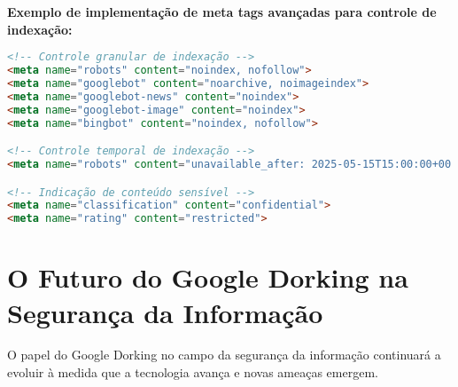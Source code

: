 \documentclass[12pt,a4paper]{book}
\begin{document}
\begin{examplebox}
\textbf{Exemplo de implementação de meta tags avançadas para controle de indexação:}

\begin{lstlisting}[language=html]
<!-- Controle granular de indexação -->
<meta name="robots" content="noindex, nofollow">
<meta name="googlebot" content="noarchive, noimageindex">
<meta name="googlebot-news" content="noindex">
<meta name="googlebot-image" content="noindex">
<meta name="bingbot" content="noindex, nofollow">

<!-- Controle temporal de indexação -->
<meta name="robots" content="unavailable_after: 2025-05-15T15:00:00+00:00">

<!-- Indicação de conteúdo sensível -->
<meta name="classification" content="confidential">
<meta name="rating" content="restricted">
\end{lstlisting}
\end{examplebox}

\section{O Futuro do Google Dorking na Segurança da Informação}

O papel do Google Dorking no campo da segurança da informação continuará a evoluir à medida que a tecnologia avança e novas ameaças emergem.
\end{document}
